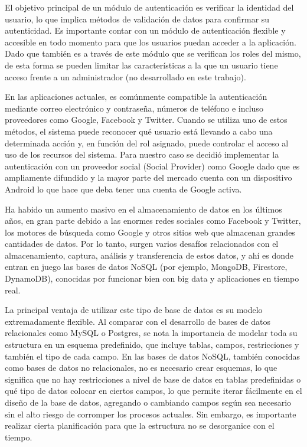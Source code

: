 El objetivo principal de un módulo de autenticación es verificar la identidad del usuario, lo que implica métodos de validación de datos para confirmar su autenticidad. Es importante contar con un módulo de autenticación flexible y accesible en todo momento para que los usuarios puedan acceder a la aplicación. Dado que también es a través de este módulo que se verifican los roles del mismo, de esta forma se pueden limitar las características a la que un usuario tiene acceso frente a un administrador (no desarrollado en este trabajo).

En las aplicaciones actuales, es comúnmente compatible la autenticación mediante correo electrónico y contraseña, números de teléfono e incluso proveedores como Google, Facebook y Twitter. Cuando se utiliza uno de estos métodos, el sistema puede reconocer qué usuario está llevando a cabo una determinada acción y, en función del rol asignado, puede controlar el acceso al uso de los recursos del sistema. Para nuestro caso se decidió implementar la autenticación con un proveedor social (Social Provider) como Google dado que es ampliamente difundido y la mayor parte del mercado cuenta con un dispositivo Android lo que hace que deba tener una cuenta de Google activa.

Ha habido un aumento masivo en el almacenamiento de datos en los últimos años, en gran parte debido a las enormes redes sociales como Facebook y Twitter, los motores de búsqueda como Google y otros sitios web que almacenan grandes cantidades de datos. Por lo tanto, surgen varios desafíos relacionados con el almacenamiento, captura, análisis y transferencia de estos datos, y ahí es donde entran en juego las bases de datos NoSQL (por ejemplo, MongoDB, Firestore, DynamoDB), conocidas por funcionar bien con big data y aplicaciones en tiempo real.

La principal ventaja de utilizar este tipo de base de datos es su modelo extremadamente flexible. Al comparar con el desarrollo de bases de datos relacionales como MySQL o Postgres, se nota la importancia de modelar toda su estructura en un esquema predefinido, que incluye tablas, campos, restricciones y también el tipo de cada campo. En las bases de datos NoSQL, también conocidas como bases de datos no relacionales, no es necesario crear esquemas, lo que significa que no hay restricciones a nivel de base de datos en tablas predefinidas o qué tipo de datos colocar en ciertos campos, lo que permite iterar fácilmente en el diseño de la base de datos, agregando o cambiando campos según sea necesario sin el alto riesgo de corromper los procesos actuales. Sin embargo, es importante realizar cierta planificación para que la estructura no se desorganice con el tiempo.

